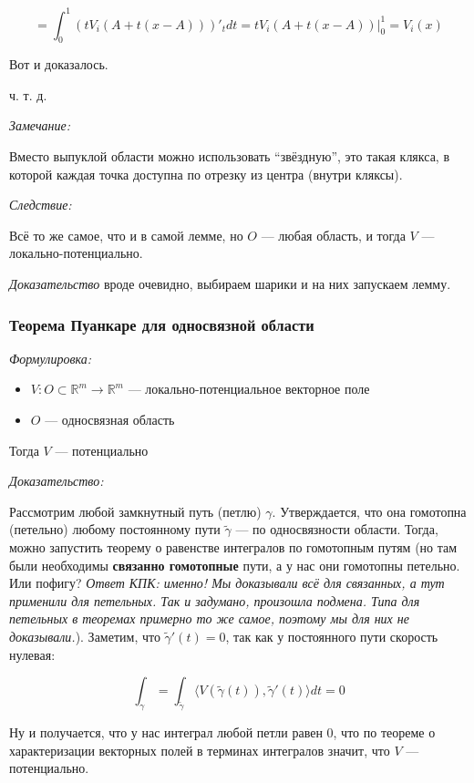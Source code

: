 \documentclass{article}
\def\sk#1#2{\langle #1, #2 \rangle}
\begin{document}
\[ = \int_0^1 \left(tV_i(A + t(x - A))\right)'_t dt = tV_i(A + t(x - A))|_0^1 = V_i(x)\]

Вот и доказалось.

ч. т. д. 

\textit{Замечание:}

Вместо выпуклой области можно использовать ``звёздную'', это такая клякса, в которой каждая точка доступна по отрезку из центра (внутри кляксы).

\textit{Следствие:}

Всё то же самое, что и в самой лемме, но $O$ --- любая область, и тогда $V$ --- локально-потенциально.

\textit{Доказательство} вроде очевидно, выбираем шарики и на них запускаем лемму.


\subsubsection{Теорема Пуанкаре для односвязной области}
\textit{Формулировка:}

\begin{itemize}
    \item $V: O \subset \mathbb{R}^m \rightarrow \mathbb{R}^m$ --- локально-потенциальное векторное поле
    \item $O$ --- односвязная область 
\end{itemize}

Тогда $V$ --- потенциально

\textit{Доказательство:}

Рассмотрим любой замкнутный путь (петлю) $\gamma$. Утверждается, что она гомотопна (петельно) любому постоянному пути $\tilde{\gamma}$ --- по односвязности области. Тогда, можно запустить теорему о равенстве интегралов по гомотопным путям (но там были необходимы \textbf{связанно гомотопные} пути, а у нас они гомотопны петельно. Или пофигу? \textit{Ответ КПК: именно! Мы доказывали всё для связанных, а тут применили для петельных. Так и задумано, произошла подмена. Типа для петельных в теоремах примерно то же самое, поэтому мы для них не доказывали.}). Заметим, что $\tilde{\gamma}'(t) = 0$, так как у постоянного пути скорость нулевая:

\[\int_{\gamma} = \int_{\tilde{\gamma}} \sk{V(\tilde{\gamma}(t))}{\tilde{\gamma}'(t)}dt = 0\]

Ну и получается, что у нас интеграл любой петли равен 0, что по теореме о характеризации векторных полей в терминах интегралов значит, что $V$ --- потенциально.
\end{document}
